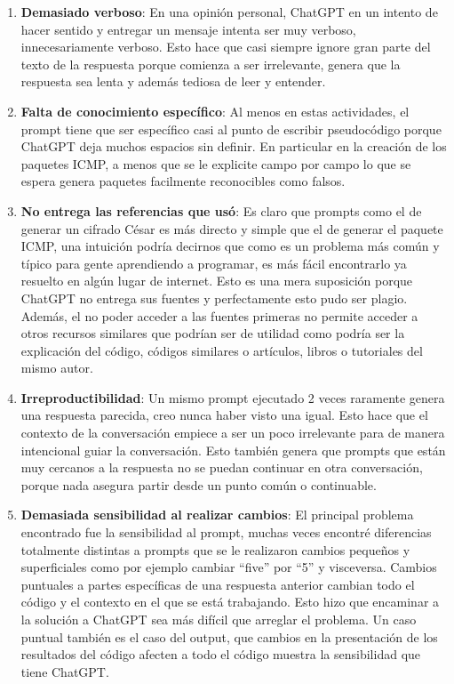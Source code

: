 \documentclass[letter,12pt]{article}
\begin{document}
\begin{enumerate}
  \item \textbf{Demasiado verboso}: En una opinión personal, ChatGPT en un intento de hacer sentido y entregar un mensaje intenta ser muy verboso, innecesariamente verboso. Esto hace que casi siempre ignore gran parte del texto de la respuesta porque comienza a ser irrelevante, genera que la respuesta sea lenta y además tediosa de leer y entender.
  \item \textbf{Falta de conocimiento específico}: Al menos en estas actividades, el prompt tiene que ser específico casi al punto de escribir pseudocódigo porque ChatGPT deja muchos espacios sin definir. En particular en la creación de los paquetes ICMP, a menos que se le explicite campo por campo lo que se espera genera paquetes facilmente reconocibles como falsos.
  \item \textbf{No entrega las referencias que usó}: Es claro que prompts como el de generar un cifrado César es más directo y simple que el de generar el paquete ICMP, una intuición podría decirnos que como es un problema más común y típico para gente aprendiendo a programar, es más fácil encontrarlo ya resuelto en algún lugar de internet. Esto es una mera suposición porque ChatGPT no entrega sus fuentes y perfectamente esto pudo ser plagio. Además, el no poder acceder a las fuentes primeras no permite acceder a otros recursos similares que podrían ser de utilidad como podría ser la explicación del código, códigos similares o artículos, libros o tutoriales del mismo autor.
  \item \textbf{Irreproductibilidad}: Un mismo prompt ejecutado 2 veces raramente genera una respuesta parecida, creo nunca haber visto una igual. Esto hace que el contexto de la conversación empiece a ser un poco irrelevante para de manera intencional guiar la conversación. Esto también genera que prompts que están muy cercanos a la respuesta no se puedan continuar en otra conversación, porque nada asegura partir desde un punto común o continuable.
  \item \textbf{Demasiada sensibilidad al realizar cambios}: El principal problema encontrado fue la sensibilidad al prompt, muchas veces encontré diferencias totalmente distintas a prompts que se le realizaron cambios pequeños y superficiales como por ejemplo cambiar ``five'' por ``5'' y visceversa. Cambios puntuales a partes específicas de una respuesta anterior cambian todo el código y el contexto en el que se está trabajando. Esto hizo que encaminar a la solución a ChatGPT sea más difícil que arreglar el problema. Un caso puntual también es el caso del output, que cambios en la presentación de los resultados del código afecten a todo el código muestra la sensibilidad que tiene ChatGPT.
\end{enumerate}
\end{document}
